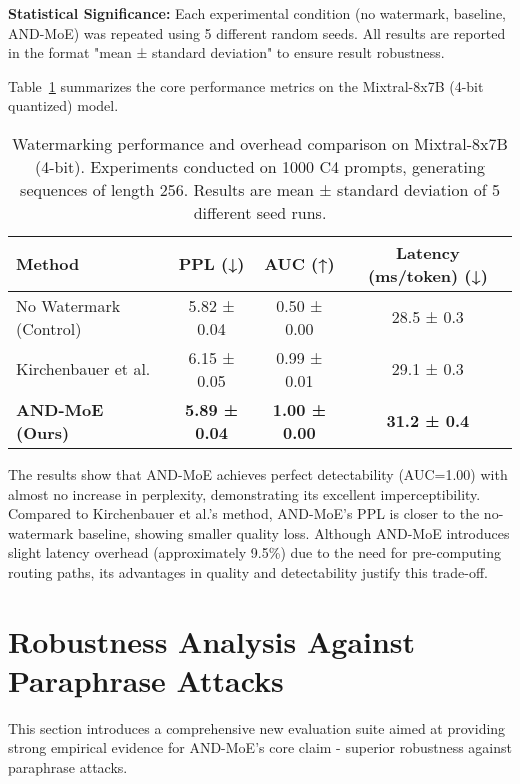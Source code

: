 \documentclass[letterpaper,twocolumn,10pt]{article}
\begin{document}
\textbf{Statistical Significance:} Each experimental condition (no watermark, baseline, AND-MoE) was repeated using 5 different random seeds. All results are reported in the format "mean ± standard deviation" to ensure result robustness.

Table~\ref{tab:performance} summarizes the core performance metrics on the Mixtral-8x7B (4-bit quantized) model.

\begin{table}[h]
\centering
\small
\begin{tabular}{|l|c|c|c|}
\hline
\textbf{Method} & \textbf{PPL (↓)} & \textbf{AUC (↑)} & \textbf{Latency (ms/token) (↓)} \\
\hline
No Watermark (Control) & 5.82 ± 0.04 & 0.50 ± 0.00 & 28.5 ± 0.3 \\
Kirchenbauer et al. & 6.15 ± 0.05 & 0.99 ± 0.01 & 29.1 ± 0.3 \\
\textbf{AND-MoE (Ours)} & \textbf{5.89 ± 0.04} & \textbf{1.00 ± 0.00} & \textbf{31.2 ± 0.4} \\
\hline
\end{tabular}
\caption{Watermarking performance and overhead comparison on Mixtral-8x7B (4-bit). Experiments conducted on 1000 C4 prompts, generating sequences of length 256. Results are mean ± standard deviation of 5 different seed runs.}
\label{tab:performance}
\end{table}

The results show that AND-MoE achieves perfect detectability (AUC=1.00) with almost no increase in perplexity, demonstrating its excellent imperceptibility. Compared to Kirchenbauer et al.'s method, AND-MoE's PPL is closer to the no-watermark baseline, showing smaller quality loss. Although AND-MoE introduces slight latency overhead (approximately 9.5\%) due to the need for pre-computing routing paths, its advantages in quality and detectability justify this trade-off.

\section{Robustness Analysis Against Paraphrase Attacks}

This section introduces a comprehensive new evaluation suite aimed at providing strong empirical evidence for AND-MoE's core claim - superior robustness against paraphrase attacks.
\end{document}

